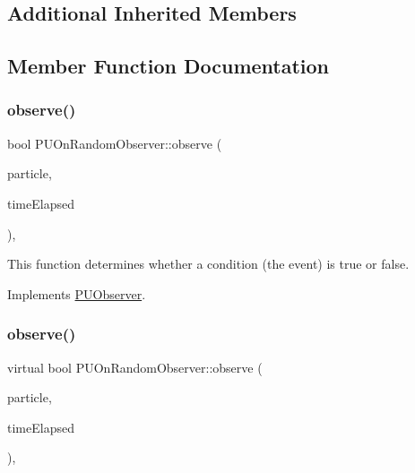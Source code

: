 \subsection*{Additional Inherited Members}


\subsection{Member Function Documentation}
\mbox{\label{classPUOnRandomObserver_a788e7e6c809434acb224aa15183a9554}} 
\subsubsection{\texorpdfstring{observe()}{observe()}\hspace{0.1cm}{\footnotesize\ttfamily [1/2]}}
{\footnotesize\ttfamily bool P\+U\+On\+Random\+Observer\+::observe (\begin{DoxyParamCaption}\item[{\hyperlink{structPUParticle3D}{P\+U\+Particle3D} $\ast$}]{particle,  }\item[{float}]{time\+Elapsed }\end{DoxyParamCaption})\hspace{0.3cm}{\ttfamily [override]}, {\ttfamily [virtual]}}

This function determines whether a condition (the event) is true or false. 

Implements \hyperlink{classPUObserver_a50f59cc3245e291b641463db5d3037f7}{P\+U\+Observer}.

\mbox{\label{classPUOnRandomObserver_a00961e9d122d4343ddf9b63c8c0dd720}} 
\subsubsection{\texorpdfstring{observe()}{observe()}\hspace{0.1cm}{\footnotesize\ttfamily [2/2]}}
{\footnotesize\ttfamily virtual bool P\+U\+On\+Random\+Observer\+::observe (\begin{DoxyParamCaption}\item[{\hyperlink{structPUParticle3D}{P\+U\+Particle3D} $\ast$}]{particle,  }\item[{float}]{time\+Elapsed }\end{DoxyParamCaption})\hspace{0.3cm}{\ttfamily [override]}, {\ttfamily [virtual]}}

